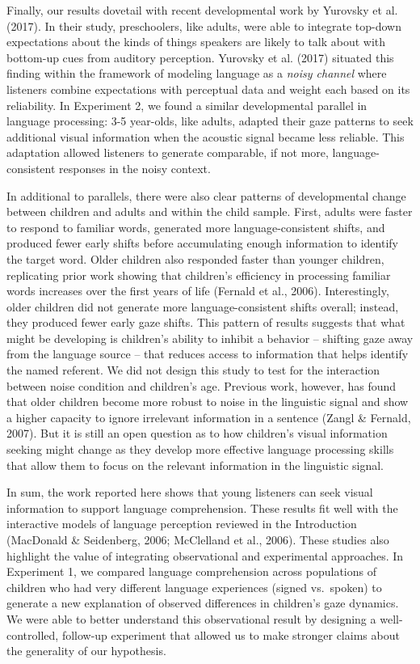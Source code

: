 \documentclass[,man,floatsintext]{apa6}
\begin{document}
Finally, our results dovetail with recent developmental work by Yurovsky et al. (2017). In their study, preschoolers, like adults, were able to integrate top-down expectations about the kinds of things speakers are likely to talk about with bottom-up cues from auditory perception. Yurovsky et al. (2017) situated this finding within the framework of modeling language as a \emph{noisy channel} where listeners combine expectations with perceptual data and weight each based on its reliability. In Experiment 2, we found a similar developmental parallel in language processing: 3-5 year-olds, like adults, adapted their gaze patterns to seek additional visual information when the acoustic signal became less reliable. This adaptation allowed listeners to generate comparable, if not more, language-consistent responses in the noisy context.

In additional to parallels, there were also clear patterns of developmental change between children and adults and within the child sample. First, adults were faster to respond to familiar words, generated more language-consistent shifts, and produced fewer early shifts before accumulating enough information to identify the target word. Older children also responded faster than younger children, replicating prior work showing that children's efficiency in processing familiar words increases over the first years of life (Fernald et al., 2006). Interestingly, older children did not generate more language-consistent shifts overall; instead, they produced fewer early gaze shifts. This pattern of results suggests that what might be developing is children's ability to inhibit a behavior -- shifting gaze away from the language source -- that reduces access to information that helps identify the named referent. We did not design this study to test for the interaction between noise condition and children's age. Previous work, however, has found that older children become more robust to noise in the linguistic signal and show a higher capacity to ignore irrelevant information in a sentence (Zangl \& Fernald, 2007). But it is still an open question as to how children's visual information seeking might change as they develop more effective language processing skills that allow them to focus on the relevant information in the linguistic signal.

In sum, the work reported here shows that young listeners can seek visual information to support language comprehension. These results fit well with the interactive models of language perception reviewed in the Introduction (MacDonald \& Seidenberg, 2006; McClelland et al., 2006). These studies also highlight the value of integrating observational and experimental approaches. In Experiment 1, we compared language comprehension across populations of children who had very different language experiences (signed vs.~spoken) to generate a new explanation of observed differences in children's gaze dynamics. We were able to better understand this observational result by designing a well-controlled, follow-up experiment that allowed us to make stronger claims about the generality of our hypothesis.
\end{document}

